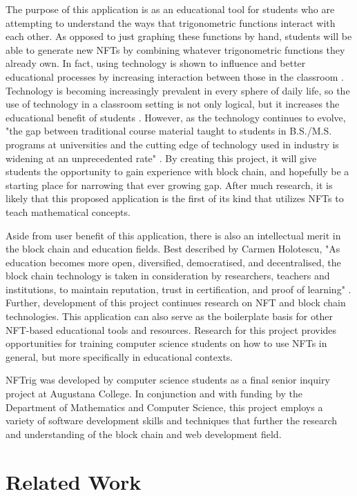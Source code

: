 \documentclass[acmsmall,nonacm]{acmart}
\begin{document}
The purpose of this application is as an educational tool for students who are attempting to understand the ways that trigonometric functions interact with each other. As opposed to just graphing these functions by hand, students will be able to generate new NFTs by combining whatever trigonometric functions they already own. In fact, using technology is shown to influence and better educational processes by increasing interaction between those in the classroom \cite{elmessiry2021nft}. Technology is becoming increasingly prevalent in every sphere of daily life, so the use of technology in a classroom setting is not only logical, but it increases the educational benefit of students \cite{raja2018impact}. However, as the technology continues to evolve, "the gap between traditional course material taught to students in B.S./M.S. programs at universities and the cutting edge of technology used in industry is widening at an unprecedented rate" \cite{rao2019developing}. By creating this project, it will give students the opportunity to gain experience with block chain, and hopefully be a starting place for narrowing that ever growing gap. After much research, it is likely that this proposed application is the first of its kind that utilizes NFTs to teach mathematical concepts. 

Aside from user benefit of this application, there is also an intellectual merit in the block chain and education fields. Best described by Carmen Holotescu, "As education becomes more open, diversified, democratised, and decentralised, the block chain technology is taken in consideration by researchers, teachers and institutions, to maintain reputation, trust in certification, and proof of learning" \cite{holotescu2018understanding}. Further, development of this project continues research on NFT and block chain technologies. This application can also serve as the boilerplate basis for other NFT-based educational tools and resources. Research for this project provides opportunities for training computer science students on how to use NFTs in general, but more specifically in educational contexts. 

NFTrig was developed by computer science students as a final senior inquiry project at Augustana College. In conjunction and with funding by the Department of Mathematics and Computer Science, this project employs a variety of software development skills and techniques that further the research and understanding of the block chain and web development field.

\section{Related Work}
\end{document}

